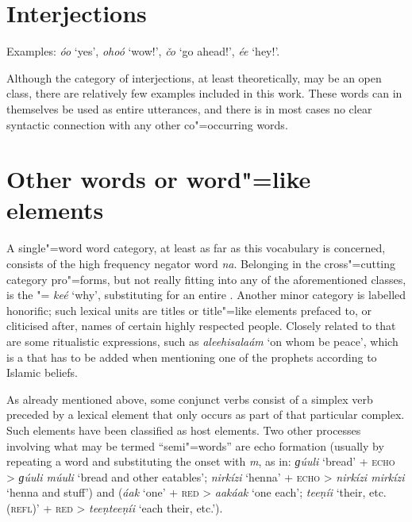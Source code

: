 \section{Interjections}
\label{sec:3b-14}
Examples: \textit{óo} `yes', \textit{ohoó} `wow!', \textit{čo} `go ahead!', \textit{ée} `hey!'.


Although the category of interjections, at least theoretically, may be an open class, there are relatively few examples included in this work. These words can in themselves be used as entire utterances, and there is in most cases no clear syntactic connection with any other co"=occurring words.


\section{Other words or word"=like elements}
\label{sec:3b-15}
A single"=word word category, at least as far as this vocabulary is concerned, consists of the high frequency negator word \textit{na}. Belonging in the cross"=cutting category pro"=forms, but not really fitting into any of the aforementioned classes, is the "= \textit{keé} `why', substituting for an entire . Another minor category is labelled honorific; such lexical units are titles or title"=like elements prefaced to, or cliticised after, names of certain highly respected people. Closely related to that are some ritualistic expressions, such as \textit{aleehisalaám} `on whom be peace', which is a  that has to be added when mentioning one of the prophets according to Islamic beliefs.


As already mentioned above, some conjunct verbs consist of a simplex verb preceded by a lexical element that only occurs as part of that particular complex. Such elements have been classified as host elements. Two other processes involving what may be termed ``semi"=words'' are echo formation (usually by repeating a word and substituting the onset with \textit{m}, as in: \textit{ɡúuli} `bread' + \textsc{echo} > \textit{ɡúuli múuli} `bread and other eatables'; \textit{nirkízi} `henna' + \textsc{echo} > \textit{nirkízi mirkízi} `henna and stuff') and  (\textit{áak} `one' + \textsc{red} > \textit{aakáak} `one each'; \textit{teeṇíi} `their, etc. (\textsc{refl})' + \textsc{red} > \textit{teeṇteeṇíi} `each their, etc.').

